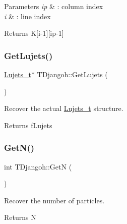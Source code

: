 \begin{DoxyParams}{Parameters}
{\em ip} & \+: column index \\
\hline
{\em i} & \+: line index \\
\hline
\end{DoxyParams}
\begin{DoxyReturn}{Returns}
K\mbox{[}i-\/1\mbox{]}\mbox{[}ip-\/1\mbox{]} 
\end{DoxyReturn}
\mbox{\label{class_t_djangoh_a2572e682379a304f84f21840d488fa0c}} 
\subsubsection{\texorpdfstring{Get\+Lujets()}{GetLujets()}}
{\footnotesize\ttfamily \hyperlink{struct_lujets__t}{Lujets\+\_\+t}$\ast$ T\+Djangoh\+::\+Get\+Lujets (\begin{DoxyParamCaption}{ }\end{DoxyParamCaption})\hspace{0.3cm}{\ttfamily [inline]}}



Recover the actual \hyperlink{struct_lujets__t}{Lujets\+\_\+t} structure. 

\begin{DoxyReturn}{Returns}
f\+Lujets 
\end{DoxyReturn}
\mbox{\label{class_t_djangoh_a501e50bbb1ad6a75014fd7c555313b74}} 
\subsubsection{\texorpdfstring{Get\+N()}{GetN()}}
{\footnotesize\ttfamily int T\+Djangoh\+::\+GetN (\begin{DoxyParamCaption}{ }\end{DoxyParamCaption})\hspace{0.3cm}{\ttfamily [inline]}}



Recover the number of particles. 

\begin{DoxyReturn}{Returns}
N 
\end{DoxyReturn}
\mbox{\label{class_t_djangoh_afb58be11a10e8a6a4b442ea0fe4e16f5}} 
